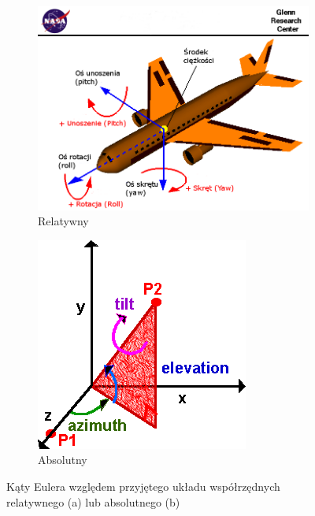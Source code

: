 \begin{figure}
	\centering
	\begin{subfigure}[b]{0.7\textwidth}
		\centering
		\includegraphics[width=\linewidth]{images/nasaAircraft.png}
		\caption{Relatywny \cite{nasa2016}}
		\label{fig:appx:rot:eulerRel}
	\end{subfigure}	
	\begin{subfigure}[b]{0.7\textwidth}
		\centering
		\includegraphics[width=\linewidth]{images/eulerAbsolute.png}
		\caption{Absolutny \cite{Baker2015}}
		\label{fig:appx:rot:eulerAbs}
	\end{subfigure}									
	\caption{Kąty Eulera względem przyjętego układu współrzędnych relatywnego (a) lub absolutnego (b)}
\end{figure}
		
